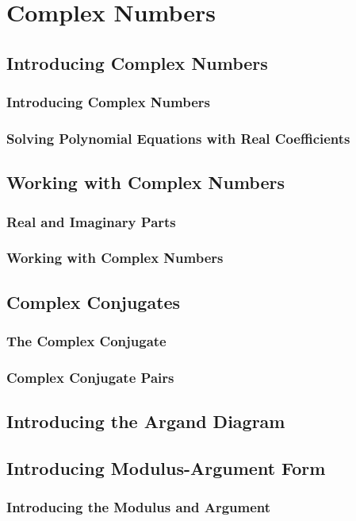 \documentclass[../alevelmaths.tex]{subfiles}
\begin{document}
\chapter{Complex Numbers}
\section{Introducing Complex Numbers}
\subsection*{Introducing Complex Numbers}
\subsection*{Solving Polynomial Equations with Real Coefficients}
\section{Working with Complex Numbers}
\subsection*{Real and Imaginary Parts}
\subsection*{Working with Complex Numbers}
\section{Complex Conjugates}
\subsection*{The Complex Conjugate}
\subsection*{Complex Conjugate Pairs}
\section{Introducing the Argand Diagram}
\section{Introducing Modulus-Argument Form}
\subsection*{Introducing the Modulus and Argument}
\end{document}
